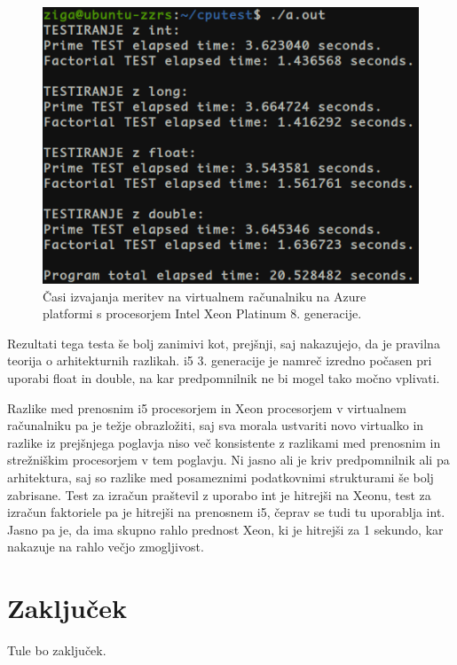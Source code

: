 \begin{figure}[H]
	\centering
	\includegraphics[scale=0.55]{Img/Azure_cputest2.png}
	\caption{Časi izvajanja meritev na virtualnem računalniku na Azure platformi s procesorjem Intel Xeon Platinum 8. generacije.}
	\label{fig:7_breme2}
\end{figure}

Rezultati tega testa še bolj zanimivi kot, prejšnji, saj nakazujejo, da je pravilna teorija o arhitekturnih razlikah. i5 3. generacije je namreč izredno počasen pri uporabi float in double, na kar predpomnilnik ne bi mogel tako močno vplivati.

Razlike med prenosnim i5 procesorjem in Xeon procesorjem v virtualnem računalniku pa je težje obrazložiti, saj sva morala ustvariti novo virtualko in razlike iz prejšnjega poglavja niso več konsistente z razlikami med prenosnim in strežniškim procesorjem v tem poglavju. Ni jasno ali je kriv predpomnilnik ali pa arhitektura, saj so razlike med posameznimi podatkovnimi strukturami še bolj zabrisane. Test za izračun praštevil z uporabo int je hitrejši na Xeonu, test za izračun faktoriele pa je hitrejši na prenosnem i5, čeprav se tudi tu uporablja int. Jasno pa je, da ima skupno rahlo prednost Xeon, ki je hitrejši za 1 sekundo, kar nakazuje na rahlo večjo zmogljivost.



\section{Zaključek}
Tule bo zaključek.

